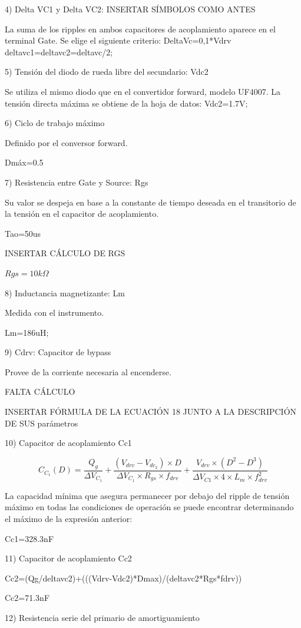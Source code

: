 4) Delta VC1 y Delta VC2: INSERTAR SÍMBOLOS COMO ANTES

La suma de los ripples en ambos capacitores de acoplamiento aparece en el terminal Gate. 
Se elige el siguiente criterio:
DeltaVc=0,1*Vdrv
deltavc1=deltavc2=deltavc/2;

5) Tensión del diodo de rueda libre del secundario: Vdc2

Se utiliza el mismo diodo que en el convertidor forward, modelo UF4007. 
La tensión directa máxima se obtiene de la hoja de datos: 
Vdc2=1.7V;

6) Ciclo de trabajo máximo 

Definido por el conversor forward.

Dmáx=0.5

7) Resistencia entre Gate y Source: Rgs

Su valor se despeja en base a la constante de tiempo deseada en el transitorio de la tensión en el capacitor de acoplamiento.

Tao=50us

INSERTAR CÁLCULO DE RGS

$Rgs=10k\Omega$

8) Inductancia magnetizante: Lm

Medida con el instrumento. 

Lm=186uH;

9) Cdrv: Capacitor de bypass

Provee de la corriente necesaria al encenderse. 

FALTA CÁLCULO

INSERTAR FÓRMULA DE LA ECUACIÓN 18 JUNTO A LA DESCRIPCIÓN DE SUS parámetros

10) Capacitor de acoplamiento Cc1

$$ C_{C_1}(D)=\frac{Q_g}{\Delta V_{C_1}}+\frac{(V_{drv}-V_{{dc}_2})\times D}{\Delta V_{C_1}\times R_{gs}\times f_{drv}}+\frac{V_{drv}\times (D^2-D^3)}{\Delta V_{C1}\times 4\times L_m\times f_{drv}^2} $$

La capacidad mínima que asegura permanecer por debajo del ripple de tensión máximo en todas las condiciones de operación 
se puede encontrar determinando el máximo de la expresión anterior:

Cc1=328.3nF

11) Capacitor de acoplamiento Cc2

Cc2=(Qg/deltavc2)+(((Vdrv-Vdc2)*Dmax)/(deltavc2*Rgs*fdrv))

Cc2=71.3nF

12) Resistencia serie del primario de amortiguamiento


